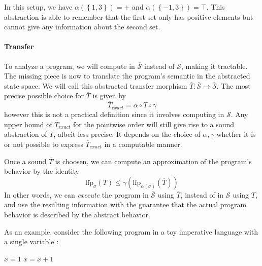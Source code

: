 \documentclass[11pt]{article}
\renewcommand{\S}{\mathcal{S}}
\newcommand{\oS}{\overline{\mathcal{S}}}
\begin{document}
\hfill

In this setup, we have $\alpha(\left\{1,3\right\}) = +$ and $\alpha(\left\{-1,3\right\}) = \top$. This abstraction is able to remember that the first set only has positive elements but cannot give any information about the second set.

\paragraph{Transfer} To analyze a program, we will compute in $\oS$ instead of $\S$, making it tractable. The missing piece is now to translate the program's semantic in the abstracted state space. We will call this abstracted transfer morphism $\overline{T}:\oS\to\oS$. The most precise possible choice for $\overline{T}$ is given by
\[ \overline{T}_{exact} = \alpha\circ T\circ \gamma \]
however this is not a practical definition since it involves computing in $\S$. Any upper bound of $\overline{T}_{exact}$ for the pointwise order will still give rise to a sound abstraction of $T$, albeit less precise. It depends on the choice of $\alpha,\gamma$ whether it is or not possible to express $\overline{T}_{exact}$ in a computable manner.

Once a sound $\overline{T}$ is choosen, we can compute an approximation of the program's behavior by the identity
\[ \text{lfp}_\sigma(T) \leq \gamma(\text{lfp}_{\alpha(\sigma)}(\overline{T})) \]
In other words, we can \emph{execute} the program in $\oS$ using $\overline{T}$, instead of in $\S$ using $T$, and use the resulting information with the guarantee that the actual program behavior is described by the abstract behavior.

As an example, consider the following program in a toy imperative language with a single variable :

\begin{algorithmic}[1]
\State $x = 1$
\State $x = x+1$
\EndWhile
\end{algorithmic}
\end{document}
